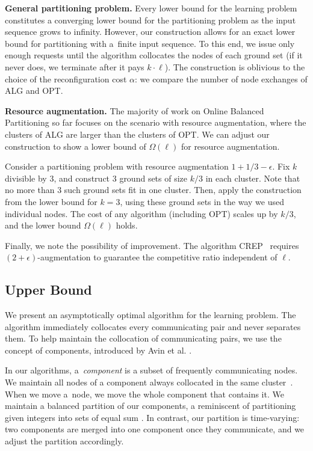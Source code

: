 \documentclass[a4paper,anonymous,USenglish]{lipics-v2019}
\newcommand{\OPT}{\textsc{OPT}\xspace}
\newcommand{\ALG}{\textsc{ALG}\xspace}
\begin{document}
\noindent
\textbf{General partitioning problem.}
Every lower bound for the learning problem constitutes a converging lower bound for the partitioning problem as the input sequence grows to infinity.
However, our construction allows for an exact lower bound for partitioning with a~finite input sequence.
To this end, we issue only enough requests until the algorithm collocates the nodes of each ground set (if it never does, we terminate after it pays $k\cdot \ell$).
The construction is oblivious to the choice of the reconfiguration cost $\alpha$: we compare the 	number of node exchanges of \ALG and \OPT.



\noindent
\textbf{Resource augmentation.}
The majority of work on Online Balanced Partitioning so far \cite{repartition-disc,sigmetrics19_partitioning} focuses on the scenario with resource augmentation, where the clusters of \ALG are larger than the clusters of \OPT.
We can adjust our construction to show a lower bound of $\Omega(\ell)$ for resource augmentation.

Consider a partitioning problem with resource augmentation $1+1/3-\epsilon$.
Fix $k$ divisible by $3$, and construct $3$ ground sets of size $k/3$ in each cluster.
Note that no more than $3$ such ground sets fit in one cluster.
Then, apply the construction from the lower bound for $k=3$, using these ground sets in the way we used individual nodes.
The cost of any algorithm (including \OPT) scales up by $k/3$, and the lower bound $\Omega(\ell)$ holds.

Finally, we note the possibility of improvement. The algorithm CREP~\cite{repartition-disc} requires $(2+\epsilon)$-augmentation to guarantee the competitive ratio independent of $\ell$.

\subsection{Upper Bound}
\label{sec:ppl}

We present an asymptotically optimal algorithm for the learning problem.
The algorithm immediately collocates every communicating pair and never separates them.
To help maintain the collocation of communicating pairs, we use the concept of components, introduced by Avin et al. \cite{repartition-disc}.

In our algorithms, a~\emph{component} is a subset of frequently communicating nodes.
We maintain all nodes of a component always collocated in the same cluster~\cite{repartition-disc}.
When we  move a~node, we move the whole component that contains it.
We maintain a balanced partition of our components,
a reminiscent of partitioning given integers into sets of equal sum \cite{integer-partitions-book}.
In contrast, our partition is time-varying:  two components are merged into one component once they communicate, and we adjust the partition accordingly.
\end{document}
